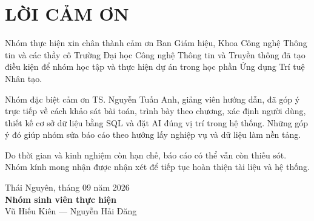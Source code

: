 \chapter*{LỜI CẢM ƠN}

Nhóm thực hiện xin chân thành cảm ơn Ban Giám hiệu, Khoa Công nghệ Thông tin và các thầy cô Trường Đại học Công nghệ Thông tin và Truyền thông đã tạo điều kiện để nhóm học tập và thực hiện dự án trong học phần Ứng dụng Trí tuệ Nhân tạo.

Nhóm đặc biệt cảm ơn TS. Nguyễn Tuấn Anh, giảng viên hướng dẫn, đã góp ý trực tiếp về cách khảo sát bài toán, trình bày theo chương, xác định người dùng, thiết kế cơ sở dữ liệu bằng SQL và đặt AI đúng vị trí trong hệ thống. Những góp ý đó giúp nhóm sửa báo cáo theo hướng lấy nghiệp vụ và dữ liệu làm nền tảng.

Do thời gian và kinh nghiệm còn hạn chế, báo cáo có thể vẫn còn thiếu sót. Nhóm kính mong nhận được nhận xét để tiếp tục hoàn thiện tài liệu và hệ thống.

\begin{flushright}
Thái Nguyên, tháng 09 năm 2026\\[10mm]
\textbf{Nhóm sinh viên thực hiện}\\[8mm]
Vũ Hiếu Kiên --- Nguyễn Hải Đăng
\end{flushright}
